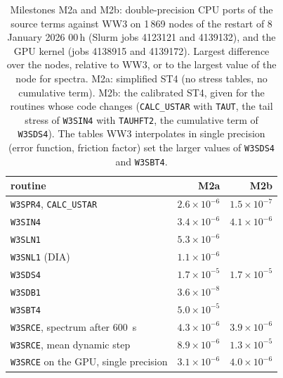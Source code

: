 \documentclass[11pt,a4paper]{article}
\begin{document}
\begin{table}[H]
\centering\small
\begin{tabular}{lrr}
\toprule
routine & M2a & M2b \\
\midrule
\texttt{W3SPR4}, \texttt{CALC\_USTAR} & $2.6\times10^{-6}$ & $1.5\times10^{-7}$ \\
\texttt{W3SIN4} & $3.4\times10^{-6}$ & $4.1\times10^{-6}$ \\
\texttt{W3SLN1} & $5.3\times10^{-6}$ & \\
\texttt{W3SNL1} (DIA) & $1.1\times10^{-6}$ & \\
\texttt{W3SDS4} & $1.7\times10^{-5}$ & $1.7\times10^{-5}$ \\
\texttt{W3SDB1} & $3.6\times10^{-8}$ & \\
\texttt{W3SBT4} & $5.0\times10^{-5}$ & \\
\texttt{W3SRCE}, spectrum after \SI{600}{s} & $4.3\times10^{-6}$ & $3.9\times10^{-6}$ \\
\texttt{W3SRCE}, mean dynamic step & $8.9\times10^{-6}$ & $1.3\times10^{-5}$ \\
\texttt{W3SRCE} on the GPU, single precision & $3.1\times10^{-6}$ & $4.0\times10^{-6}$ \\
\bottomrule
\end{tabular}
\caption{Milestones M2a and M2b: double-precision CPU ports of the source
terms against WW3 on 1\,869 nodes of the restart of 8 January 2026 00\,h
(Slurm jobs 4123121 and 4139132), and the GPU kernel (jobs 4138915 and
4139172).
Largest difference over the nodes, relative to WW3, or to the largest
value of the node for spectra. M2a: simplified ST4 (no stress tables, no
cumulative term). M2b: the calibrated ST4, given for the routines whose
code changes (\texttt{CALC\_USTAR} with \texttt{TAUT}, the tail stress of
\texttt{W3SIN4} with \texttt{TAUHFT2}, the cumulative term of
\texttt{W3SDS4}). The tables WW3 interpolates in single precision (error
function, friction factor) set the larger values of \texttt{W3SDS4} and
\texttt{W3SBT4}.}
\label{tab:m2src}
\end{table}
\end{document}
